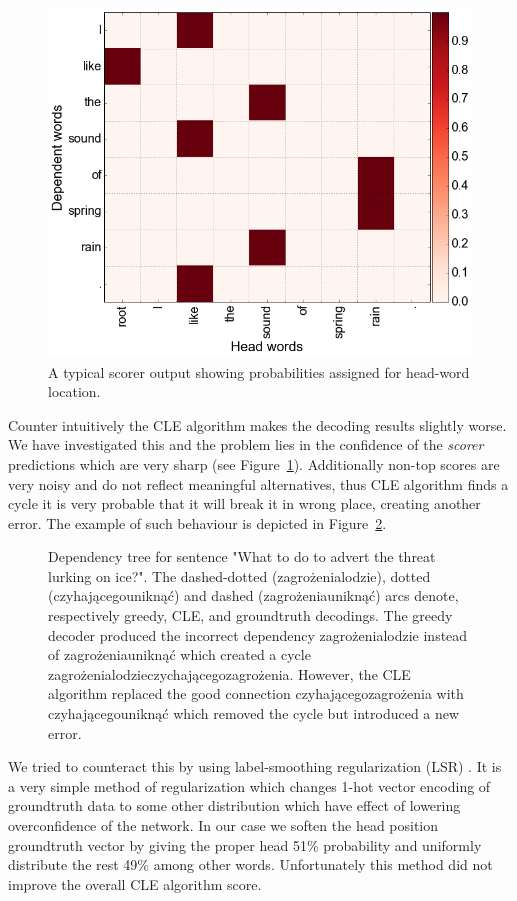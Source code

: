 \begin{figure}[!htbp]
  \centering
  \includegraphics[width=0.6\linewidth]{img/examples/cle/attention.png}
  \caption{A typical scorer output showing probabilities assigned for head-word location.} 
  \label{fig:attention}
\end{figure}

Counter intuitively the CLE algorithm makes the decoding results slightly worse.
We have investigated this and the problem lies in the confidence of the
\emph{scorer} predictions which are very sharp (see Figure~\ref{fig:attention}).
Additionally non-top scores are very noisy and do not reflect  meaningful alternatives,
thus CLE algorithm finds a cycle it is very probable that it will break it
in wrong place, creating another error. The example of such behaviour is depicted
in Figure~\ref{fig:cle}.

\begin{figure}[!htbp]
  \centering
  \caption{Dependency tree for sentence "What to do to advert the threat lurking on ice?".
    The dashed-dotted (zagrożenia\txtrightarrow lodzie), dotted (czyhającego\txtrightarrow uniknąć)
    and dashed (zagrożenia\txtrightarrow uniknąć) arcs denote, respectively greedy, CLE, and groundtruth decodings.
    The greedy decoder produced the incorrect dependency zagrożenia\txtrightarrow lodzie instead of
    zagrożenia\txtrightarrow uniknąć which created a cycle zagrożenia\txtrightarrow lodzie\txtrightarrow czychającego\txtrightarrow zagrożenia.
    However, the CLE algorithm replaced the good connection
    czyhającego\txtrightarrow zagrożenia with czyhającego\txtrightarrow uniknąć
    which removed the cycle but introduced a new error.} 
  \label{fig:cle}
\end{figure}

We tried to counteract this by using label-smoothing regularization (LSR)
\cite{szegedy_rethinking_2015}.
It is a very simple method of regularization which changes 1-hot vector encoding
of groundtruth data to some other distribution which have effect of lowering overconfidence
of the network. In our case we soften the head position groundtruth vector by
giving the proper head 51\% probability and uniformly distribute the rest 49\%
among other words. Unfortunately this method did not improve the overall CLE algorithm
score.

